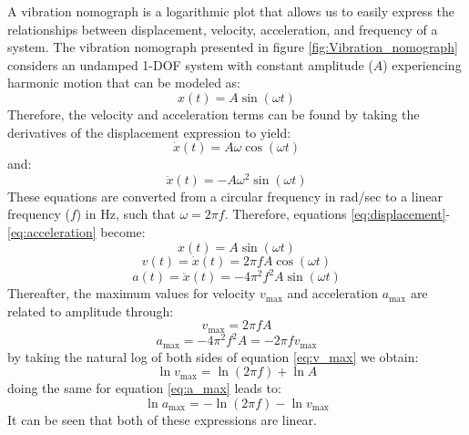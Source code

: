 \documentclass[12pt,letter]{article}
\begin{document}
A vibration nomograph is a logarithmic plot that allows us to easily express the relationships between displacement, velocity, acceleration, and frequency of a system. The vibration nomograph presented in figure \ref{fig:Vibration_nomograph} considers an undamped 1-DOF system with constant amplitude ($A$) experiencing harmonic motion that can be modeled as:
\begin{equation}
    x(t) = A \sin(\omega t)
    \label{eq:displacement}
\end{equation}
Therefore, the velocity and acceleration terms can be found by taking the derivatives of the displacement expression to yield:
\begin{equation}
    \dot{x}(t) = A \omega \cos(\omega t)
\end{equation}
and:
\begin{equation}
    \ddot{x}(t) = -A\omega^2 \sin(\omega t)
    \label{eq:acceleration}
\end{equation}
These equations are converted from a circular frequency in rad/sec to a linear frequency ($f$) in Hz, such that $\omega = 2\pi f$. Therefore, equations \ref{eq:displacement}-\ref{eq:acceleration} become:
\begin{equation}
    x(t) = A \sin(\omega t)
\end{equation}
\begin{equation}
    v(t) =  \dot{x}(t) = 2\pi f A \cos(\omega t)
\end{equation}
\begin{equation}
    a(t) =  \ddot{x}(t) = -4\pi^2 f^2 A \sin(\omega t)
\end{equation}
Thereafter, the maximum values for velocity $v_\text{max}$ and acceleration $a_\text{max}$ are related to amplitude through:
\begin{equation}
    v_\text{max} = 2\pi f A 
    \label{eq:v_max}
\end{equation}
\begin{equation}
    a_\text{max} = -4\pi^2 f^2 A = -2 \pi f v_\text{max}
    \label{eq:a_max}
\end{equation}
by taking the natural log of both sides of equation \ref{eq:v_max} we obtain: 
\begin{equation}
    \ln v_\text{max} = \ln(2\pi f) + \ln A
    \label{eq:ln_v_max} 
\end{equation}
doing the same for equation \ref{eq:a_max} leads to:
\begin{equation}
     \ln a_\text{max} = - \ln(2\pi f) - \ln v_\text{max}
    \label{eq:ln_v_max_2} 
\end{equation}
It can be seen that both of these expressions are linear. 
\end{document}
